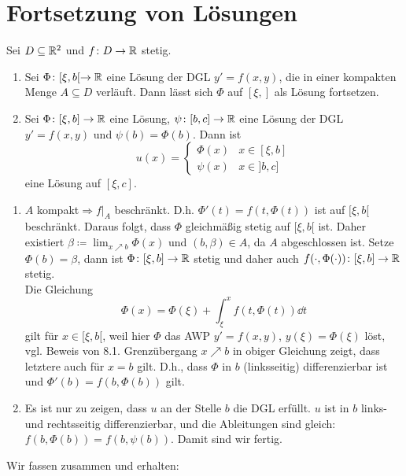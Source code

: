 \chapter{Fortsetzung von L\"osungen}
\begin{lemma}
	Sei $ D\subseteq\mathbb{R}^2 $ und $ f\colon D\rightarrow\mathbb{R} $ stetig.
	\begin{enumerate}
		\item Sei $ \Phi\colon[\xi,b[\rightarrow\mathbb{R} $ eine L\"osung der DGL $ y'=f(x,y) $, die in einer kompakten Menge $ A\subseteq D $ verl\"auft. Dann l\"asst sich $ \Phi $ auf $ [\xi,] $ als L\"osung fortsetzen.
		\item Sei $ \Phi\colon[\xi,b]\rightarrow\mathbb{R} $ eine L\"osung, $ \psi\colon[b,c]\rightarrow\mathbb{R} $ eine L\"osung der DGL $ y'=f(x,y) $ und $ \psi(b)=\Phi(b) $. Dann ist
		\[ u(x)=\begin{cases}
		\Phi(x)&x\in[\xi,b]\\\psi(x)&x\in]b,c]
		\end{cases} \]
		eine L\"osung auf $ [\xi,c] $.
	\end{enumerate}
\end{lemma}
\begin{beweis}
	\begin{enumerate}
		\item $ A $ kompakt$ \Rightarrow f|_A $ beschr\"ankt. D.h. $ \Phi'(t)=f(t,\Phi(t)) $ ist auf $ [\xi,b[ $ beschr\"ankt. Daraus folgt, dass $ \Phi $ gleichm\"a\ss ig stetig auf $ [\xi,b[ $ ist. Daher existiert $ \beta\coloneqq\lim_{x\nearrow b}\Phi(x) $ und $ (b,\beta)\in A $, da $ A $ abgeschlossen ist. Setze $ \Phi(b)=\beta $, dann ist $ \Phi\colon[\xi,b]\rightarrow\mathbb{R} $ stetig und daher auch $ f(\cdot,\Phi(\cdot))\colon[\xi,b]\rightarrow\mathbb{R} $ stetig.\\
		Die Gleichung
		\[ \Phi(x)=\Phi(\xi)+\int_{\xi}^{x}f(t,\Phi(t))\dd t \]
		gilt f\"ur $ x\in[\xi,b[ $, weil hier $ \Phi $ das AWP $ y'=f(x,y) $, $ y(\xi)=\Phi(\xi) $ l\"ost, vgl. Beweis von 8.1. Grenz\"ubergang $ x\nearrow b $ in obiger Gleichung zeigt, dass letztere auch f\"ur $ x=b $ gilt. D.h., dass $ \Phi $ in $ b $ (linksseitig) differenzierbar ist und $ \Phi'(b)=f(b,\Phi(b)) $ gilt.
		\item Es ist nur zu zeigen, dass $ u $ an der Stelle $ b $ die DGL erf\"ullt. $ u $ ist in $ b $ links- und rechtsseitig differenzierbar, und die Ableitungen sind gleich: $ f(b,\Phi(b))=f(b,\psi(b)) $. Damit sind wir fertig.
	\end{enumerate}
\end{beweis}
Wir fassen zusammen und erhalten:
